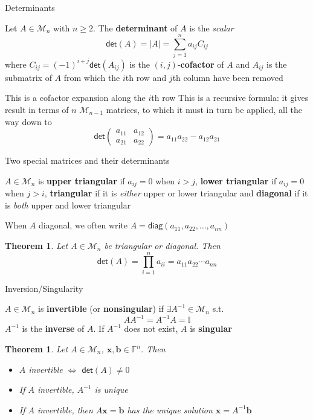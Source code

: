 \documentclass{beamer}
\def\IF{\mathbb{F}}
\def\II{\mathbb{I}}
\def\bb{\mathbf{b}}
\def\bx{\mathbf{x}}
\def\M{\mathcal{M}}
\newcommand{\diag}{\ensuremath{\mathsf{diag}}}
\renewcommand{\det}{\ensuremath{\mathsf{det}}}
\newtheorem{importanttheorem}[theorem]{Theorem}
\begin{document}
\begin{frame}{Determinants}
\begin{definition}[Determinant]
Let $A\in\M_n$ with $n\geq 2$. The \textbf{determinant} of $A$ is the \emph{scalar}
\[
\det(A)=|A|=\sum_{j=1}^na_{ij}C_{ij}
\]
where $C_{ij}=(-1)^{i+j}\det(A_{ij})$ is the $(i,j)$-\textbf{cofactor} of $A$ and $A_{ij}$ is the submatrix of $A$ from which the $i$th row and $j$th column have been removed
\end{definition}
This is a cofactor expansion along the $i$th row
\vfill
This is a recursive formula: it gives result in terms of $n$ $\M_{n-1}$ matrices, to which it must in turn be applied, all the way down to
\[
\det\left(
\begin{matrix}
a_{11} & a_{12} \\ a_{21} & a_{22}
\end{matrix}\right) = a_{11}a_{22}-a_{12}a_{21}
\]
\end{frame}

\begin{frame}{Two special matrices and their determinants}
\begin{definition}
$A\in\M_n$ is \textbf{upper triangular} if $a_{ij}=0$ when $i>j$, \textbf{lower triangular} if $a_{ij}=0$ when $j>i$, \textbf{triangular} if it is \emph{either} upper or lower triangular and \textbf{diagonal} if it is \emph{both} upper and lower triangular
\end{definition}
When $A$ diagonal, we often write $A=\diag(a_{11},a_{22},\ldots,a_{nn})$
\begin{importanttheorem}
Let $A\in\M_n$ be triangular or diagonal. Then
\[
\det(A)=\prod_{i=1}^n a_{ii}=a_{11}a_{22}\cdots a_{nn}
\]
\end{importanttheorem}
\end{frame}

\begin{frame}{Inversion/Singularity}
\begin{definition}
$A\in\M_n$ is \textbf{invertible} (or \textbf{nonsingular}) if $\exists A^{-1}\in\M_n$ s.t.
\[
AA^{-1}=A^{-1}A=\II
\]
$A^{-1}$ is the \textbf{inverse} of $A$. If $A^{-1}$ does not exist, $A$ is \textbf{singular}
\end{definition}
\begin{importanttheorem}
Let $A\in\M_n$, $\bx,\bb\in\IF^n$. Then
\begin{itemize}
	\item $A$ invertible $\iff$ $\det(A)\neq 0$
	\item If $A$ invertible, $A^{-1}$ is unique
	\item If $A$ invertible, then $A\bx=\bb$ has the unique solution $\bx=A^{-1}\bb$
\end{itemize}
\end{importanttheorem}
\end{frame}
\end{document}
